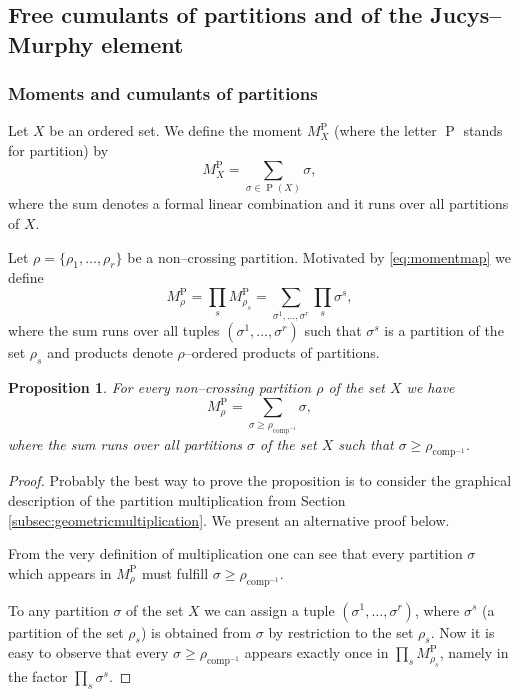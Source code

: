 \documentclass[12pt,dvips]{amsart}
\numberwithin{equation}{section} \numberwithin{figure}{section}
\theoremstyle{plain}
\newtheorem{proposition}[lemma]{Proposition}
\theoremstyle{definition}
\theoremstyle{remark}
\newcommand{\Mpp}{M^{\pp}}
\DeclareMathOperator{\comp}{comp}
\newcommand{\compinv}{{\comp^{-1}}}
\DeclareMathOperator{\pp}{P}
\DeclareMathOperator{\PP}{P}
\begin{document}
\subsection[Free cumulants of partitions]%
{Free cumulants of partitions and of the Jucys--Murphy element}

\subsubsection{Moments and cumulants of partitions} \label{sec:momentypartycji} Let
$X$ be an ordered set. We define the moment $\Mpp_X$ (where the
letter $\pp$ stands for partition) by \index{$MPP$@$\Mpp$}
$$\Mpp_X=\sum_{\sigma\in\PP(X)} \sigma,$$
where the sum denotes a formal linear combination and it runs over
all partitions of $X$.

Let $\rho=\{\rho_1,\dots,\rho_r\}$ be a non--crossing partition.
Motivated by \eqref{eq:momentmap} we define
$$\Mpp_\rho=\prod_{s}  \Mpp_{\rho_s}=\sum_{\sigma^1,\dots,\sigma^r} \prod_s \sigma^s,$$
where the sum runs over all tuples $(\sigma^1,\dots,\sigma^r)$ such
that $\sigma^s$ is a partition of the set $\rho_s$ and products
denote $\rho$--ordered products of partitions.

\begin{proposition}
\label{prop:formulanamomentypartycji} For every non--crossing
partition $\rho$ of the set $X$ we have
\begin{equation}
\label{eq:momentpartition} \Mpp_\rho=\sum_{\sigma\geq
\rho_{\compinv}} \sigma,
\end{equation} where the sum runs over all partitions $\sigma$ of
the set $X$ such that $\sigma\geq \rho_{\compinv}$.
\end{proposition}
\begin{proof}
Probably the best way to prove the proposition is to consider the
graphical description of the partition multiplication from Section
\ref{subsec:geometricmultiplication}. We present an alternative
proof below.

 From the very definition of multiplication one can see that
every partition $\sigma$ which appears in $\Mpp_\rho$ must fulfill
$\sigma\geq \rho_{\compinv}$.

To any partition $\sigma$ of the set $X$ we can assign a tuple
$(\sigma^1,\dots,\sigma^r)$, where $\sigma^s$ (a partition of the
set $\rho_s$) is obtained from $\sigma$ by restriction to the set
$\rho_s$. Now it is easy to observe that every $\sigma\geq
\rho_{\compinv}$ appears exactly once in $\prod_s \Mpp_{\rho_s}$,
namely in the factor $\prod_s \sigma^s$.
\end{proof}
\end{document}
